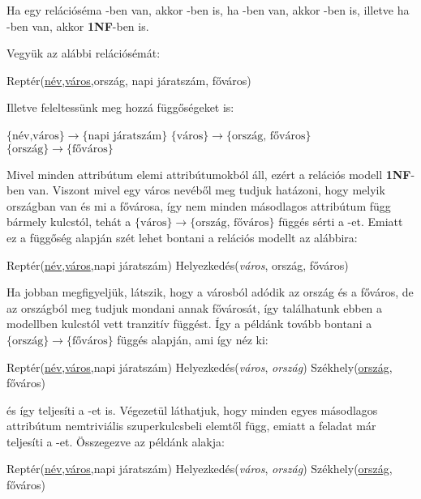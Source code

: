 \begin{tet}
Ha egy relációséma \BCNF-ben van, akkor \nfh-ben is, ha \nfh-ben van, akkor \nfk -ben is, illetve ha \nfk-ben van, akkor \textbf{1NF}-ben is. 
\end{tet}

\begin{pld}
Vegyük az alábbi relációsémát:
\begin{center}
    Reptér(\underline{név},\underline{város},ország, napi járatszám, főváros)
\end{center}
Illetve feleltessünk meg hozzá függőségeket is:
\begin{center}
    $\{\text{név,város}\} \longrightarrow \{\text{napi járatszám}\}$ \break
    $\{\text{város}\} \longrightarrow \{\text{ország, főváros}\}$ \break
    $\{\text{ország}\} \longrightarrow \{\text{főváros}\}$ 
\end{center}
Mivel minden attribútum elemi attribútumokból áll, ezért a relációs modell \textbf{1NF}-ben van. Viszont mivel egy város nevéből meg tudjuk hatázoni, hogy melyik országban van és mi a fővárosa, így nem minden másodlagos attribútum függ bármely kulcstól, tehát a $\{\text{város}\} \rightarrow \{\text{ország, főváros}\}$ függés sérti a \nfk-et. Emiatt ez a függőség alapján szét lehet bontani a relációs modellt az alábbira:
\begin{center}
    Reptér(\underline{név},\underline{város},napi járatszám) \break
    Helyezkedés(\textit{város}, ország, főváros)
\end{center}
Ha jobban megfigyeljük, látszik, hogy a városból adódik az ország és a főváros, de az országból meg tudjuk mondani annak fővárosát, így találhatunk ebben a modellben kulcstól vett tranzitív függést. Így a példánk tovább bontani a $\{\text{ország}\} \rightarrow \{\text{főváros}\}$ függés alapján, ami így néz ki:
\begin{center}
    Reptér(\underline{név},\underline{város},napi járatszám) \break
    Helyezkedés(\textit{város}, \textit{ország})\break
    Székhely(\underline{ország}, főváros)
\end{center}
és így teljesíti a \nfh-et is. Végezetül láthatjuk, hogy minden egyes másodlagos attribútum nemtriviális szuperkulcsbeli elemtől függ, emiatt a feladat már teljesíti a \BCNF-et.\hfill \break
Összegezve az példánk \BCNF alakja:
\begin{center}
    Reptér(\underline{név},\underline{város},napi járatszám) \break
    Helyezkedés(\textit{város}, \textit{ország})\break
    Székhely(\underline{ország}, főváros)
\end{center}
\end{pld}
